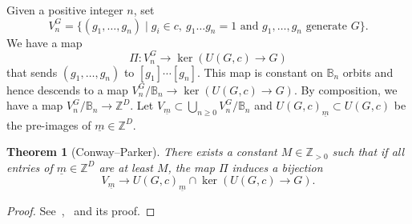 \documentclass{amsart}
\numberwithin{equation}{section} \numberwithin{figure}{section}
\newcommand\ZZ{\mathbb{Z}}
\theoremstyle{one}
\newtheorem{theorem}{\textbf{Theorem}}[section]
\theoremstyle{definition}
\begin{document}
Given a positive integer \(n\), set
\[ V_n^G = \{(g_1, \dots, g_n) \mid g_i \in c,\ g_1\dots g_n=1 \text{ and } g_1,\dots , g_n \text{ generate } G\}.\]
We have a map \[\Pi \colon V_n^G \to \ker(U(G,c)\to G)\] that sends \((g_1,\dots, g_n)\) to \([g_1]\cdots[g_n]\).
This map is constant on {\(\mathbb{B}_n\)} orbits and hence descends to a map \(V_n^G/{\mathbb{B}_n} \to \ker(U(G,c)\to G)\).
By composition, we have a map \(V_n^G/{\mathbb{B}_n} \to \ZZ^D\).
Let \( V_{\underline{m}}\subset \bigcup_{n\geq 0}V_n^G/{\mathbb{B}_n} \) and \(U(G,c)_{\underline{m}}\subset U(G,c)\) be the pre-images of \(\underline{m}\in\ZZ^D\). 
\begin{theorem}[Conway--Parker]\label{thm:CP}
  There exists a constant $M\in\ZZ_{>0}$ such that if all entries of $\underline{m}\in\ZZ^D$ are at least $M$, the map \(\Pi\) induces a bijection
  \[ V_{\underline{m}} \to  U(G,c)_{\underline{m}}\cap \ker(U(G,c)\to G).\]
\end{theorem}
\begin{proof}
See~\cite[Theorem~12.5]{liu.woo.zur:24},~\cite[Theorem~3.1]{woo:21} and its proof.
\end{proof}
\end{document}
